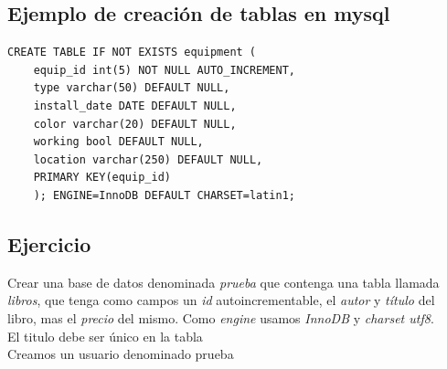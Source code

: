 \documentclass[4paper]{article}
\newcommand{\M}{mysql}
\begin{document}
\subsection{Ejemplo de creación de tablas en \M}
\begin{verbatim}
CREATE TABLE IF NOT EXISTS equipment (
    equip_id int(5) NOT NULL AUTO_INCREMENT,
    type varchar(50) DEFAULT NULL,
    install_date DATE DEFAULT NULL,
    color varchar(20) DEFAULT NULL,
    working bool DEFAULT NULL,
    location varchar(250) DEFAULT NULL,
    PRIMARY KEY(equip_id)
    ); ENGINE=InnoDB DEFAULT CHARSET=latin1;
\end{verbatim}

\subsection{Ejercicio}
Crear una base de datos denominada \emph{prueba} que contenga una tabla llamada \emph{libros}, que tenga como campos un \emph{id} autoincrementable, el \emph{autor} y \emph{título} del libro, mas el \emph{precio} del mismo. Como \emph{engine} usamos \emph{InnoDB} y \emph{charset utf8}.\\
El titulo debe ser único en la tabla\\
Creamos un usuario denominado prueba 
\end{document}
